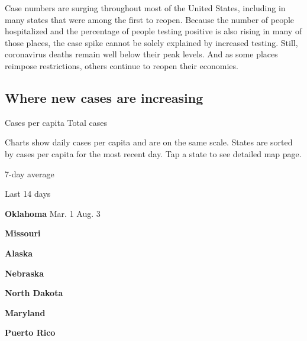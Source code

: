 Case numbers are surging throughout most of the United States, including
in many states that were among the first to reopen. Because the number
of people hospitalized and the percentage of people testing positive is
also rising in many of those places, the case spike cannot be solely
explained by increased testing. Still, coronavirus deaths remain well
below their peak levels. And as some places reimpose restrictions,
others continue to reopen their economies.

\hypertarget{where-new-cases-are-increasing}{%
\subsection{Where new cases are
increasing}\label{where-new-cases-are-increasing}}

Cases per capita Total cases

Charts show daily cases per capita and are on the same scale. States are
sorted by cases per capita for the most recent day. Tap a state to see
detailed map page.

\href{https://www.nytimes.com/interactive/2020/us/oklahoma-coronavirus-cases.html}{}

7-day average

Last 14 days

\textbf{Oklahoma} Mar. 1 Aug. 3

\href{https://www.nytimes.com/interactive/2020/us/missouri-coronavirus-cases.html}{}

\textbf{Missouri}

\href{https://www.nytimes.com/interactive/2020/us/alaska-coronavirus-cases.html}{}

\textbf{Alaska}

\href{https://www.nytimes.com/interactive/2020/us/nebraska-coronavirus-cases.html}{}

\textbf{Nebraska}

\href{https://www.nytimes.com/interactive/2020/us/north-dakota-coronavirus-cases.html}{}

\textbf{North Dakota}

\href{https://www.nytimes.com/interactive/2020/us/maryland-coronavirus-cases.html}{}

\textbf{Maryland}

\href{https://www.nytimes.com/interactive/2020/us/puerto-rico-coronavirus-cases.html}{}

\textbf{Puerto Rico}

\href{https://www.nytimes.com/interactive/2020/us/illinois-coronavirus-cases.html}{}

